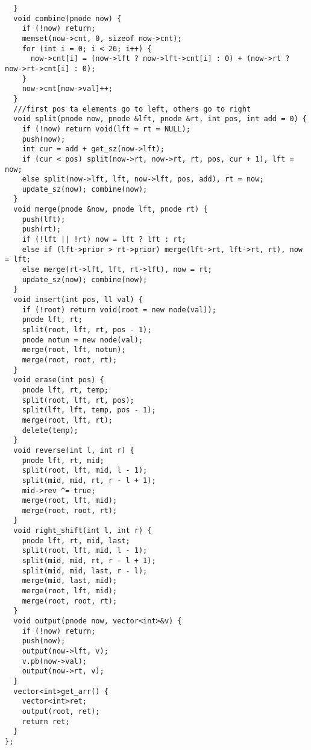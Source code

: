 \documentclass[FSZ,a4paper,onesided]{article}
\begin{document}
\begin{multicols*}{\COLS}
\begin{lstlisting}
  }
  void combine(pnode now) {
    if (!now) return;
    memset(now->cnt, 0, sizeof now->cnt);
    for (int i = 0; i < 26; i++) {
      now->cnt[i] = (now->lft ? now->lft->cnt[i] : 0) + (now->rt ? now->rt->cnt[i] : 0);
    }
    now->cnt[now->val]++;
  }
  ///first pos ta elements go to left, others go to right
  void split(pnode now, pnode &lft, pnode &rt, int pos, int add = 0) {
    if (!now) return void(lft = rt = NULL);
    push(now);
    int cur = add + get_sz(now->lft);
    if (cur < pos) split(now->rt, now->rt, rt, pos, cur + 1), lft = now;
    else split(now->lft, lft, now->lft, pos, add), rt = now;
    update_sz(now); combine(now);
  }
  void merge(pnode &now, pnode lft, pnode rt) {
    push(lft);
    push(rt);
    if (!lft || !rt) now = lft ? lft : rt;
    else if (lft->prior > rt->prior) merge(lft->rt, lft->rt, rt), now = lft;
    else merge(rt->lft, lft, rt->lft), now = rt;
    update_sz(now); combine(now);
  }
  void insert(int pos, ll val) {
    if (!root) return void(root = new node(val));
    pnode lft, rt;
    split(root, lft, rt, pos - 1);
    pnode notun = new node(val);
    merge(root, lft, notun);
    merge(root, root, rt);
  }
  void erase(int pos) {
    pnode lft, rt, temp;
    split(root, lft, rt, pos);
    split(lft, lft, temp, pos - 1);
    merge(root, lft, rt);
    delete(temp);
  }
  void reverse(int l, int r) {
    pnode lft, rt, mid;
    split(root, lft, mid, l - 1);
    split(mid, mid, rt, r - l + 1);
    mid->rev ^= true;
    merge(root, lft, mid);
    merge(root, root, rt);
  }
  void right_shift(int l, int r) {
    pnode lft, rt, mid, last;
    split(root, lft, mid, l - 1);
    split(mid, mid, rt, r - l + 1);
    split(mid, mid, last, r - l);
    merge(mid, last, mid);
    merge(root, lft, mid);
    merge(root, root, rt);
  }
  void output(pnode now, vector<int>&v) {
    if (!now) return;
    push(now);
    output(now->lft, v);
    v.pb(now->val);
    output(now->rt, v);
  }
  vector<int>get_arr() {
    vector<int>ret;
    output(root, ret);
    return ret;
  }
};
\end{lstlisting}

\end{multicols*}
\end{document}
